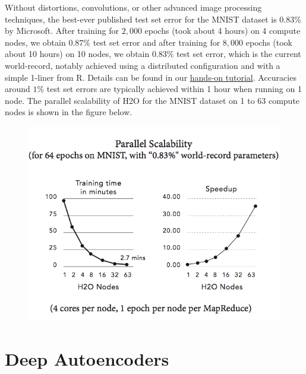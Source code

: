 \documentclass{article}[11pt]
\begin{document}
Without distortions, convolutions, or other advanced image processing techniques, the best-ever published test set error for the MNIST dataset is $0.83$\% by Microsoft. After training for $2,000$ epochs (took about 4 hours) on 4 compute nodes, we obtain $0.87\%$ test set error and after training for $8,000$ epochs (took about 10 hours) on 10 nodes, we obtain $0.83\%$ test set error, which is the current world-record, notably achieved using a distributed configuration and with a simple 1-liner from R. Details can be found in our \href{http://learn.h2o.ai/content/hands-on_training/deep_learning.html}{hands-on tutorial}. Accuracies around $1\%$ test set errors are typically achieved within 1 hour when running on 1 node.
The parallel scalability of H2O for the MNIST dataset on 1 to 63 compute nodes is shown in the figure below.
\begin{figure}[h!]
\centering
\includegraphics{scalability_new.png}
\end{figure}
\bigskip
\bigskip
\bigskip
\section{Deep Autoencoders}
\label{sec:DeepAutoencoders}  
\end{document}
